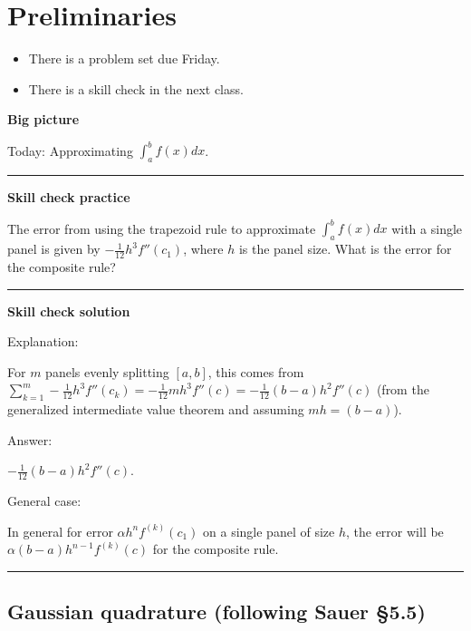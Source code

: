 \documentclass[12pt,letterpaper,noanswers]{exam}
\begin{document}
 \pdfpageheight 11in 
  \pdfpagewidth 8.5in

\noindent 

\section*{Preliminaries}

\begin{itemize}
\itemsep0pt
\item There is a problem set due Friday.
\item There is a skill check in the next class.
\end{itemize}


\noindent\textbf{Big picture}

Today: Approximating $\int_{a}^{b}f(x)dx$.

\vspace{0.2cm}
\hrule
\vspace{0.2cm}

\noindent \textbf{Skill check practice}

 The error from using the trapezoid rule to approximate $\int_a^b f(x)dx$ with a single panel is given by $-\frac{1}{12}h^3f''(c_1)$, where $h$ is the panel size.  What is the error for the composite rule?



\vspace{0.2cm}
\hrule
\vspace{0.2cm}

\noindent \textbf{Skill check solution}

Explanation:

For $m$ panels evenly splitting $[a,b]$, this comes from $\sum\limits_{k=1}^m -\frac{1}{12}h^3f''(c_k) = -\frac{1}{12}mh^3f''(c) = -\frac{1}{12}(b-a)h^2f''(c)$ (from the generalized intermediate value theorem and assuming $mh = (b-a)$).


Answer:

 $-\frac{1}{12}(b-a)h^2f''(c)$.  


General case:

In general for error $\alpha h^nf^{(k)}(c_1)$ on a single panel of size $h$, the error will be $\alpha (b-a)h^{n-1}f^{(k)}(c)$ for the composite rule.


\vspace{0.2cm}
\hrule
\vspace{0.2cm}






\subsection*{Gaussian quadrature (following Sauer \S5.5)}
\end{document}
